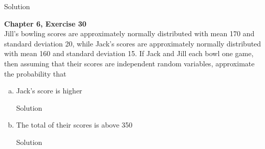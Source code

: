 \documentclass{article}
\begin{document}
\begin{spacing}{1.1}
\begin{homeworkProblem}
\begin{enumerate}[(a)]
\begin{homeworkSection}{Solution}
      \end{homeworkSection}
  \end{enumerate}
\end{homeworkProblem}

\newpage
\begin{homeworkProblem}
  {\bf Chapter 6, Exercise 30}\\
  Jill's bowling scores are approximately normally distributed with 
  mean 170 and standard deviation 20, while Jack's scores are 
  approximately normally distributed with mean 160 and standard 
  deviation 15. If Jack and Jill each bowl one game, then assuming 
  that their scores are independent random variables, approximate 
  the probability that
  \begin{enumerate}[(a)]
    \item Jack's score is higher
      \begin{homeworkSection}{Solution}
        
      \end{homeworkSection}
    \item The total of their scores is above 350
      \begin{homeworkSection}{Solution}
        
      \end{homeworkSection}
  \end{enumerate}
\end{homeworkProblem}

\end{spacing}
\end{document}
